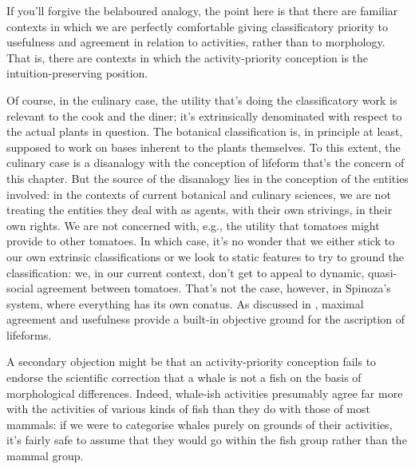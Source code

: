 \documentclass{article}
\begin{document}
If you'll forgive the belaboured analogy, the point here is that there are familiar contexts in which we are perfectly comfortable giving classificatory priority to usefulness and agreement in relation to activities, rather than to morphology. That is, there are contexts in which the activity-priority conception is the intuition-preserving position.

Of course, in the culinary case, the utility that's doing the classificatory work is relevant to the cook and the diner; it's extrinsically denominated with respect to the actual plants in question. The botanical classification is, in principle at least, supposed to work on bases inherent to the plants themselves. To this extent, the culinary case is a disanalogy with the conception of lifeform that's the concern of this chapter. But the source of the disanalogy lies in the conception of the entities involved: in the contexts of current botanical and culinary sciences, we are not treating the entities they deal with as agents, with their own strivings, in their own rights. We are not concerned with, e.g., the utility that tomatoes might provide to other tomatoes. In which case, it's no wonder that we either stick to our own extrinsic classifications or we look to static features to try to ground the classification: we, in our current context, don't get to appeal to dynamic, quasi-social agreement between tomatoes. That's not the case, however, in Spinoza's system, where everything has its own conatus. As discussed in , maximal agreement and usefulness provide a built-in objective ground for the ascription of lifeforms.

A secondary objection might be that an activity-priority conception fails to endorse the scientific correction that a whale is not a fish on the basis of morphological differences. Indeed, whale-ish activities presumably agree far more with the activities of various kinds of fish than they do with those of most mammals: if we were to categorise whales purely on grounds of their activities, it's fairly safe to assume that they would go within the fish group rather than the mammal group.
\end{document}
